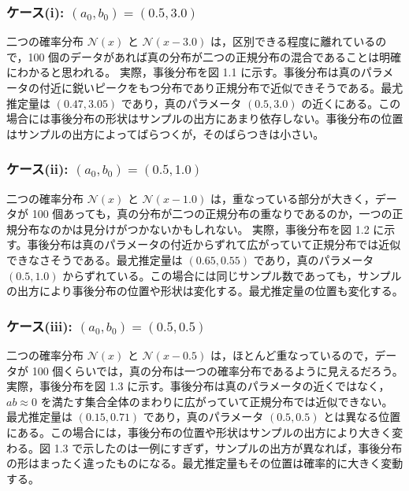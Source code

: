 \subsubsection{ケース(i): $(a_0, b_0) = (0.5, 3.0)$}

二つの確率分布 $\mathcal{N}(x)$ と $\mathcal{N}(x - 3.0)$ は，区別できる程度に離れているので，100 個のデータがあれば真の分布が二つの正規分布の混合であることは明確にわかると思われる。
実際，事後分布を図 1.1 に示す。事後分布は真のパラメータの付近に鋭いピークをもつ分布であり正規分布で近似できそうである。最尤推定量は $(0.47, 3.05)$ であり，真のパラメータ $(0.5, 3.0)$ の近くにある。この場合には事後分布の形状はサンプルの出方にあまり依存しない。事後分布の位置はサンプルの出方によってばらつくが，そのばらつきは小さい。

\subsubsection{ケース(ii): $(a_0, b_0) = (0.5, 1.0)$}

二つの確率分布 $\mathcal{N}(x)$ と $\mathcal{N}(x - 1.0)$ は，重なっている部分が大きく，データが 100 個あっても，真の分布が二つの正規分布の重なりであるのか，一つの正規分布なのかは見分けがつかないかもしれない。
実際，事後分布を図 1.2 に示す。事後分布は真のパラメータの付近からずれて広がっていて正規分布では近似できなさそうである。最尤推定量は $(0.65, 0.55)$ であり，真のパラメータ $(0.5, 1.0)$ からずれている。この場合には同じサンプル数であっても，サンプルの出方により事後分布の位置や形状は変化する。最尤推定量の位置も変化する。

\subsubsection{ケース(iii): $(a_0, b_0) = (0.5, 0.5)$}

二つの確率分布 $\mathcal{N}(x)$ と $\mathcal{N}(x - 0.5)$ は，ほとんど重なっているので，データが 100 個くらいでは，真の分布は一つの確率分布であるように見えるだろう。
実際，事後分布を図 1.3 に示す。事後分布は真のパラメータの近くではなく，$ab \approx 0$ を満たす集合全体のまわりに広がっていて正規分布では近似できない。最尤推定量は $(0.15, 0.71)$ であり，真のパラメータ $(0.5, 0.5)$ とは異なる位置にある。この場合には，事後分布の位置や形状はサンプルの出方により大きく変わる。図 1.3 で示したのは一例にすぎず，サンプルの出方が異なれば，事後分布の形はまったく違ったものになる。最尤推定量もその位置は確率的に大きく変動する。

